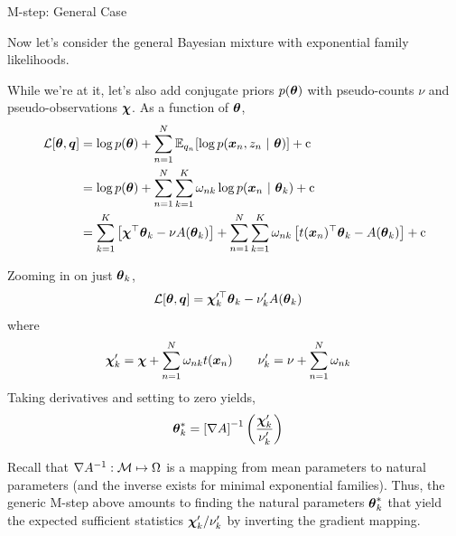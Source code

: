 \documentclass[aspectratio=169]{beamer}
\begin{document}
\begin{frame}[t, allowframebreaks]{M-step: General Case}\label{m-step-general-case}

Now let's consider the general Bayesian mixture with exponential family
likelihoods.

While we're at it, let's also add conjugate priors \(p(\boldsymbol{\theta})\) with
pseudo-counts \(\nu\) and pseudo-observations \(\boldsymbol{\chi}\). As a function
of \(\boldsymbol{\theta}\), \begin{align*}
    \mathcal{L}[\boldsymbol{\theta}, \boldsymbol{q}] 
    &= \log p(\boldsymbol{\theta}) + 
    \sum_{n=1}^N \mathbb{E}_{q_n} [\log p(\boldsymbol{x}_n, z_n ~\vert~ \boldsymbol{\theta})] + \mathrm{c} \\
    &= \log p(\boldsymbol{\theta}) + 
    \sum_{n=1}^N \sum_{k=1}^K \omega_{nk} \log p(\boldsymbol{x}_n ~\vert~ \boldsymbol{\theta}_k) + \mathrm{c} \\
    &= \sum_{k=1}^K \left[\boldsymbol{\chi}^\top \boldsymbol{\theta}_k - \nu A(\boldsymbol{\theta}_k)\right] +
    \sum_{n=1}^N \sum_{k=1}^K \omega_{nk} \left[ t(\boldsymbol{x}_n)^\top \boldsymbol{\theta}_k - A(\boldsymbol{\theta}_k) \right] + \mathrm{c} 
\end{align*}

Zooming in on just \(\boldsymbol{\theta}_k\), \begin{align*}
    \mathcal{L}[\boldsymbol{\theta}, \boldsymbol{q}] 
    &= \boldsymbol{\chi}_k'^\top \boldsymbol{\theta}_k - \nu_k' A(\boldsymbol{\theta}_k)
\end{align*} where \begin{align*}
    \boldsymbol{\chi}_k' &= \boldsymbol{\chi} + \sum_{n=1}^N \omega_{nk} t(\boldsymbol{x}_n)
    \qquad
    \nu_k' = \nu + \sum_{n=1}^N \omega_{nk}
\end{align*} Taking derivatives and setting to zero yields,
\begin{align*}
    \label{eq:gen_mstep}
    \boldsymbol{\theta}_k^* &= \left[\nabla A \right]^{-1} \left(\frac{\boldsymbol{\chi}_k'}{\nu_k'}\right)
\end{align*}

Recall that \(\nabla A^{-1}: \mathcal{M} \mapsto \Omega\) is a mapping from mean
parameters to natural parameters (and the inverse exists for minimal
exponential families). Thus, the generic M-step above amounts to finding
the natural parameters \(\boldsymbol{\theta}_k^*\) that yield the expected
sufficient statistics \(\boldsymbol{\chi}_{k}' / \nu_k'\) by inverting the gradient
mapping.
\end{frame}
\end{document}

